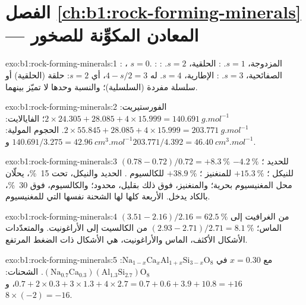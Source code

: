 \section*{الفصل \ref{ch:b1:rock-forming-minerals} --- المعادن المكوِّنة للصخور}

\begin{solution}{exo:b1:rock-forming-minerals:1}
: ، $s = 0$. : المزدوجة،
$s = 1$. : الحلقية، $s = 2$. :
الصفائحية، $s = 3$. : الإطارية، $s = 4$. 
له $4 - s/2 = 3$، أي $s = 2$: حلقة (الحلقية) أو سلسلة مفردة
(السلسلية)؛ والنسبة وحدها لا تميّز بينهما.
\end{solution}

\begin{solution}{exo:b1:rock-forming-minerals:2}
الفورستيريت: $2\times24.305 + 28.085 + 4\times15.999 =
\qty{140.691}{g.mol^{-1}}$؛ الفايالايت: $2\times55.845 + 28.085 +
4\times15.999 = \qty{203.771}{g.mol^{-1}}$. الحجوم المولية:
$140.691/3.275 = \qty{42.96}{cm^3.mol^{-1}}$ و$203.771/4.392 =
\qty{46.40}{cm^3.mol^{-1}}$.
\end{solution}

\begin{solution}{exo:b1:rock-forming-minerals:3}
$(0.78 - 0.72)/0.72 = +\qty{8.3}{\percent}$ للحديد ؛
$-\qty{4.2}{\percent}$ للنيكل ؛ $+\qty{15.3}{\percent}$ للمنغنيز ؛ $+\qty{38.9}{\percent}$ للكالسيوم . الحديد والنيكل،
تحت \qty{15}{\percent}، يحلّان محل المغنيسيوم بحرية؛ والمنغنيز، فوق ذلك بقليل، محدود؛ والكالسيوم، فوق \qty{30}{\percent}، بالكاد يدخل. الأربعة كلها لها الشحنة نفسها التي للمغنيسيوم.
\end{solution}

\begin{solution}{exo:b1:rock-forming-minerals:4}
$(3.51 - 2.16)/2.16 = \qty{62.5}{\percent}$ من الغرافيت إلى الماس؛
$(2.93 - 2.71)/2.71 = \qty{8.1}{\percent}$ من الكالسيت إلى الأراغونيت. والمتعدّدات الأشكال الأكثف، الماس والأراغونيت، هي الأشكال ذات الضغط المرتفع.
\end{solution}

\begin{solution}{exo:b1:rock-forming-minerals:5}
مع $x = 0.30$ في $\mathrm{Na}_{1-x}\mathrm{Ca}_x\mathrm{Al}_{1+x}\mathrm{Si}_{3-x}\mathrm{O}_8$:
$\mathrm{(Na_{0.7}Ca_{0.3})(Al_{1.3}Si_{2.7})O_8}$. الشحنات:
$0.7 + 2\times0.3 + 3\times1.3 + 4\times2.7 = 0.7 + 0.6 + 3.9 + 10.8 = +16$،
و$8\times(-2) = -16$.
\end{solution}

